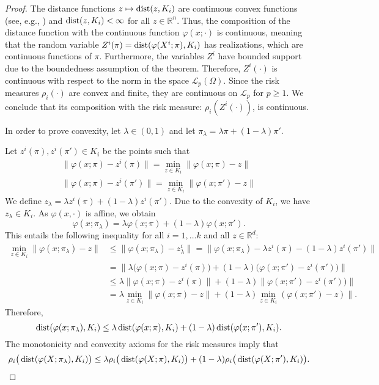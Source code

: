 \documentclass[10pt,letterpaper]{article}
\newcommand{\R}{\mathbb{R}}
\newcommand{\1}{1{\hskip -2.55 pt}\hbox{I}}
\newcommand{\dist}{\mathop{\rm dist}}
\newtheorem{proof}{Proof}
\begin{document}
\begin{proof}
 The distance functions $z\mapsto \dist(z,K_i)$ are continuous convex functions (see, e.g., \cite{beer1993topologies}) and $\dist(z,K_i)<\infty$ for all $z\in\R^n$. 
 Thus, the composition of the distance function with the continuous function $\varphi(x;\cdot)$ is continuous, meaning that the random variable 
 $Z^i (\pi) = \dist(\varphi(X^i;\pi),K_i)$ has realizations, which are continuous functions of $\pi$. Furthermore, the variables $Z^i$ have bounded support due to the boundedness assumption of the theorem.  Therefore, $Z^i (\cdot)$ is continuous with respect to the norm in the space $\mathcal{L}_p(\varOmega)$. 
 Since the risk measures $\rho_i(\cdot)$ are convex and finite, they are continuous on $\mathcal{L}_p$ for $p\geq 1$.  
 We conclude that its composition with the risk measure: $\rho_i(Z^i (\cdot))$, is continuous.

In order to prove convexity, let $\lambda\in (0,1)$ and let $\pi_\lambda = \lambda\pi +(1-\lambda)\pi'$. 

Let $z^i(\pi), z^i(\pi')\in K_i$ be the points such that 
\begin{gather}
\| \varphi(x;\pi) -z^i(\pi)\|= \min_{z\in K_i}\| \varphi(x;\pi) -z\|\\
 \| \varphi(x;\pi) -z^i(\pi')\|= \min_{z\in K_i}\| \varphi(x;\pi') -z\|
\end{gather}
We define $z_\lambda = \lambda z^i(\pi)+(1-\lambda) z^i(\pi')$. Due to the convexity of $K_i$, we have $z_\lambda\in K_i.$
As $\varphi(x,\cdot)$ is affine, we obtain
\[
\varphi(x;\pi_\lambda) = \lambda\varphi(x;\pi) +(1-\lambda)\varphi(x;\pi'). 
\]
This entails the following inequality for all $i=1,\dots k$ and all $z\in\R^d$:
\begin{align*}
\min_{z\in K_i}\| \varphi(x;\pi_\lambda) -z\| & \leq  \| \varphi(x;\pi_\lambda) -z^i_\lambda\| =  \| \varphi(x;\pi_\lambda) -\lambda z^i(\pi)-(1-\lambda) z^i(\pi')\| \\
& = \| \lambda\big(\varphi(x;\pi)-z^i(\pi)\big) +(1-\lambda)\big(\varphi(x;\pi')-z^i(\pi')\big)\big\| \\
&\leq 
\lambda\|\varphi(x;\pi)-z^i(\pi)\| +(1-\lambda)\|\varphi(x;\pi')-z^i(\pi'))\big\|\\
 & = \lambda\min_{z\in K_i}\| \varphi(x;\pi)-z\| +(1-\lambda)\min_{z\in K_i}(\varphi(x;\pi')-z)\big\|.
\end{align*}
Therefore,
\[
\dist(\varphi(x;\pi_\lambda),K_i)  \leq \lambda\dist(\varphi(x;\pi),K_i) +(1-\lambda)\dist(\varphi(x;\pi'),K_i).
\]
The monotonicity and convexity axioms for the risk measures imply that
\begin{multline*}
\rho_i \big(\dist(\varphi(X;\pi_\lambda),K_i) \big)
\leq \lambda \rho_i\big(\dist(\varphi(X;\pi),K_i) \big) %
+ (1-\lambda)\rho_i\big(\dist(\varphi(X;\pi'),K_i)\big).
\end{multline*}
\end{proof}
\end{document}
